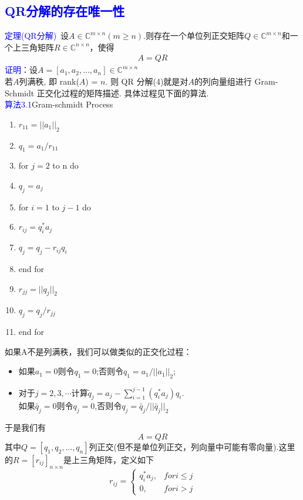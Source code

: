 \documentclass[12pt,a4paper]{article}
\begin{document}
\subsection {\textcolor{blue}{QR分解的存在唯一性}}
\textcolor{blue}{定理(QR分解)}~设$A \in \mathbb{C}^{m \times n}(m \geq n)$.则存在一个单位列正交矩阵$Q \in \mathbb{C}^{m \times n}$和一个上三角矩阵$R \in \mathbb{C}^{n \times n}$，使得
\begin{eqnarray}
    A=QR
\end{eqnarray}
\textcolor{blue}{证明}：设$A=\left[a_{1}, a_{2}, \ldots, a_{n}\right] \in \mathbb{C}^{m \times n}$\\
若$A$列满秩, 即 rank($A$) = $n$. 则 QR 分解(4)就是对$A$的列向量组进行
Gram-Schmidt 正交化过程的矩阵描述. 具体过程见下面的算法.\\
\textcolor{blue}{算法3.1}Gram-schmidt Process\\
\begin{enumerate}[1:]
	\item $r_{11}=||a_{1}||_{2}$
	\item $q_{1}=a_{1}/r_{11}$
    \item  for $j = 2$ to n do
    \item  \qquad $q_{j}=a_{j}$
    \item  \qquad for $i=1$ to $j-1$ do
    \item  \qquad \qquad $r_{ij}=q_{i}^{*}a_{j}$
    \item  \qquad \qquad $q_{j}=q_{j}-r_{ij}q_{i}$
    \item \qquad end for
    \item \qquad $r_{jj}=||q_{j}||_{2}$
    \item \qquad $q_{j}=q_{j}/r_{jj}$
    \item end for 
 \end{enumerate}
如果A不是列满秩，我们可以做类似的正交化过程：
\begin{itemize}
\item 如果$a_1=0$则令$q_1=0$;否则令$q_1=a_1/||a_1||_2$;
\item 对于$j=2,3,\cdots$计算$\tilde{q}_{j}=a_j-\sum_{i=1}^{j-1}(q_i^*a_j)q_i$.\\
如果$\tilde{q_j}=0$则令$q_j=0$,否则令$q_j=\tilde{q_j}/||\tilde{q_j}||_2$\\
\end{itemize}
于是我们有
\[
A=QR
\]
其中$Q=[q_1,q_2,...,q_n]$列正交(但不是单位列正交，列向量中可能有零向量).这里的$R=[r_{ij}]_{n\times n}$是上三角矩阵，定义如下
\[
r_{ij}=
\begin{cases}
q_{i}^{*} a_{j},&for i\leq j\\
0,&for i>j
\end{cases}
\]
\end{document}
